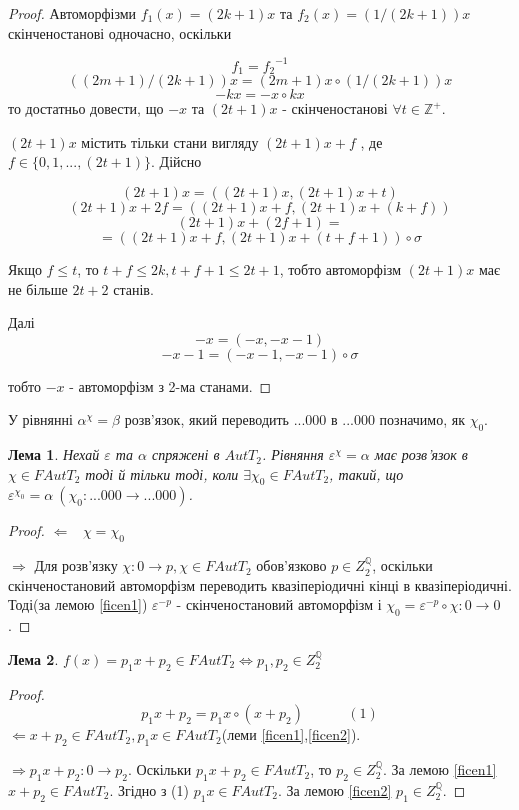 \documentclass[a4paper,12pt]{article} \usepackage{a4wide}
\numberwithin{equation}{subsection}
\newtheorem{lemma}{Лема}[subsection]
\begin{document}
\begin{proof}
Автоморфізми $f_1(x)=(2k+1)x$ та $f_2(x)=(1/(2k+1))x$
скінченостанові одночасно, оскільки

$${f_1}={f_2}^{-1}$$
$${((2m+1)/(2k+1))x}={(2m+1)x}\circ  {(1/(2k+1))x}$$
$${-kx}={-x}\circ  {kx}$$ то достатньо довести, що
${-x}$ та ${(2t+1)x}$ - скінченостанові $\forall t\in
\mathbb{Z^+}$.

 ${(2t+1)x}$  містить тільки стани вигляду ${(2t+1)x+f}$ ,
де $f\in \{0,1,...,(2t+1)\}$. Дійсно

$${(2t+1)x}=({(2t+1)x},{(2t+1)x+t})$$
$${(2t+1)x+2f}=({(2t+1)x+f},{(2t+1)x+(k+f)
})$$
$${(2t+1)x+(2f+1)}=$$ $$=({(2t+1)x+f},{(2t+1)x+(t+f+1)
})\circ  \sigma$$

Якщо $f\leq t$, то $t+f\leq 2k,t+f+1\leq 2t+1$, тобто автоморфізм
${(2t+1)x}$  має не більше $2t+2$ станів.

 Далі $${-x}=({-x},{-x-1}) $$
 $${-x-1}=({-x-1},{-x-1})\circ  \sigma $$

 тобто ${-x}$ - автоморфізм з 2-ма станами.
\end{proof}
У рівнянні $\alpha ^{\chi}=\beta$ розв'язок, який переводить
...000 в ...000 позначимо, як $\chi_0$.



\begin{lemma} \label{eqcon}Нехай $\varepsilon$ та $\alpha$ спряжені в $AutT_2$.
  Рівняння $\varepsilon^{\chi}=\alpha$ має розв'язок в $\chi\in FAutT_2$ тоді й тільки тоді,
   коли $\exists \chi_0 \in FAutT_2 $, такий, що $\varepsilon^{\chi_0}=\alpha \ (\chi_0:...000\rightarrow ...000)$.
\end{lemma}
\begin{proof}
$\Leftarrow$ \ $\chi=\chi_0$

$\Rightarrow$ Для розв'язку $\chi:0\rightarrow p,\chi \in FAutT_2$
обов'язково $p\in Z_2^{\mathbb{Q}}$, оскільки скінченостановий
автоморфізм переводить квазіперіодичні кінці в квазіперіодичні.
Тоді(за лемою \ref{ficen1}) $\varepsilon^{-p}$ - скінченостановий автоморфізм і
$\chi_0=\varepsilon^{-p}\circ  \chi:0\rightarrow 0$.

\end{proof}
\begin{lemma}\label{ficen3}
$f(x)=p_1x+p_2 \in FAutT_2 \Leftrightarrow p_1,p_2 \in
Z_2^{\mathbb{Q}}  $
\end{lemma}
\begin{proof}
$${p_1x+p_2}={p_1x}\circ  (x+p_2) \ \ \ \ \ \ \ \ \ \ \ \ \ \ (1)$$
$\Leftarrow {x+p_2}\in
 FAutT_2, {p_1x}\in
 FAutT_2 $(леми \ref{ficen1},\ref{ficen2}).

 $\Rightarrow {p_1x+p_2}:0\rightarrow p_2$. Оскільки ${p_1x+p_2}\in FAutT_2 $, то $p_2\in Z_2^{\mathbb{Q}}$.
 За лемою \ref{ficen1} ${x+p_2}\in FAutT_2$. Згідно з (1) ${p_1x}\in
 FAutT_2$. За лемою \ref{ficen2} $p_1 \in Z_2^{\mathbb{Q}}$.

\end{proof}
\end{document}
